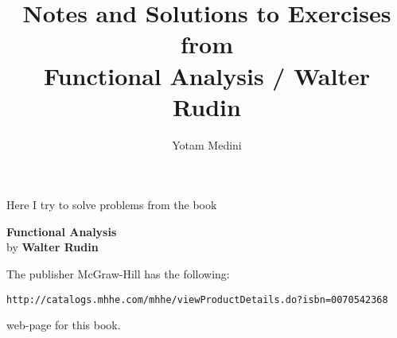 \usepackage{array}



\title{Notes and Solutions to Exercises \\
          from \\
       Functional Analysis / Walter Rudin}
\author{Yotam Medini}


\newcommand{\ellone}{\ensuremath{\ell^1}}
\newcommand{\ellp}{\ensuremath{\ell^p}}
\newcommand{\ellinf}{\ensuremath{\ell^\infty}}


\newcommand{\unfinished}{\par\textbf{Unfinished !!!!!!!!!!!!!}\par}
\newcommand{\upstar}{\raise.5ex\hbox{\(*\)}}

\newcommand{\hull}{\mathop{\rm hull}\nolimits}
\newcommand{\id}{\mathop{\rm id}\nolimits}
\newcommand{\Int}{\mathop{\rm Int}\nolimits}



\maketitle
\newpage
\tableofcontents
\newpage


\maketitle

\setcounter{chapter}{-1}

Here I try to solve problems
from the book \cite{RudinFA79}
\begin{center}
\textbf{Functional Analysis}\\
by
\textbf{Walter Rudin}
\end{center}

The publisher  McGraw-Hill has the following:
\begin{center}
\texttt{http://catalogs.mhhe.com/mhhe/viewProductDetails.do?isbn=0070542368}
\end{center}
web-page for this book.


